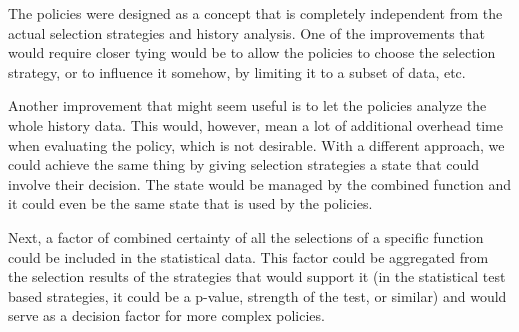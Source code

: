 The policies were designed as a concept that is completely independent from the actual selection strategies and history analysis. One of the improvements that would require closer tying would be to allow the policies to choose the selection strategy, or to influence it somehow, by limiting it to a subset of data, etc. 

Another improvement that might seem useful is to let the policies analyze the whole history data. This would, however, mean a lot of additional overhead time when evaluating the policy, which is not desirable.
With a different approach, we could achieve the same thing by giving selection strategies a state that could involve their decision. The state would be managed by the combined function and it could even be the same state that is used by the policies. 

Next, a factor of combined certainty of all the selections of a specific function could be included in the statistical data. This factor could be aggregated from the selection results of the strategies that would support it (in the statistical test based strategies, it could be a p-value, strength of the test, or similar) and would serve as a decision factor for more complex policies.


